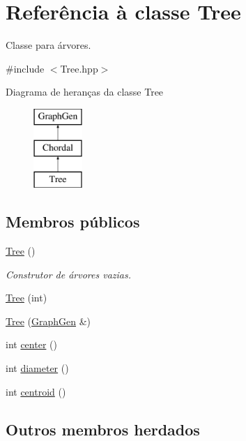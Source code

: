 \hypertarget{classTree}{}\section{Referência à classe Tree}
\label{classTree}


Classe para árvores.  




{\ttfamily \#include $<$Tree.\+hpp$>$}

Diagrama de heranças da classe Tree\begin{figure}[H]
\begin{center}
\leavevmode
\includegraphics[height=3.000000cm]{classTree}
\end{center}
\end{figure}
\subsection*{Membros públicos}
\begin{DoxyCompactItemize}
\item 
\mbox{\label{classTree_ad376a7c639d857312f5de2ef47482f68}} 
\mbox{\hyperlink{classTree_ad376a7c639d857312f5de2ef47482f68}{Tree}} ()
\begin{DoxyCompactList}\small\item\em Construtor de árvores vazias. \end{DoxyCompactList}\item 
\mbox{\hyperlink{classTree_a25977c120f94e833fdd7739daa9b8d89}{Tree}} (int)
\item 
\mbox{\hyperlink{classTree_a9f7d6a13c19b6525ee504079a5ffbd8e}{Tree}} (\mbox{\hyperlink{classGraphGen}{Graph\+Gen}} \&)
\item 
int \mbox{\hyperlink{classTree_af13c3d7650185d8703c5483d3b24a5e5}{center}} ()
\item 
int \mbox{\hyperlink{classTree_a8a296a740609d29e4ff991549b7f8f92}{diameter}} ()
\item 
int \mbox{\hyperlink{classTree_a568a379c4a528faf192b2a97ac3a20bb}{centroid}} ()
\end{DoxyCompactItemize}
\subsection*{Outros membros herdados}


